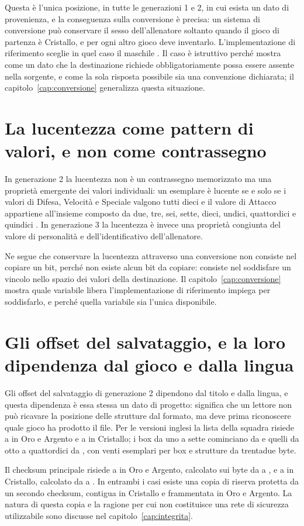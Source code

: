 Questa è l'unica posizione, in tutte le generazioni 1 e 2, in cui esista un dato di provenienza, e la conseguenza sulla conversione è precisa: un sistema di conversione può conservare il sesso dell'allenatore soltanto quando il gioco di partenza è Cristallo, e per ogni altro gioco deve inventarlo. L'implementazione di riferimento sceglie in quel caso il maschile \cite{pccs}. Il caso è istruttivo perché mostra come un dato che la destinazione richiede obbligatoriamente possa essere assente nella sorgente, e come la sola risposta possibile sia una convenzione dichiarata; il capitolo~\ref{cap:conversione} generalizza questa situazione.

\section{La lucentezza come pattern di valori, e non come contrassegno}

In generazione 2 la lucentezza non è un contrassegno memorizzato ma una proprietà emergente dei valori individuali: un esemplare è lucente se e solo se i valori di Difesa, Velocità e Speciale valgono tutti dieci e il valore di Attacco appartiene all'insieme composto da due, tre, sei, sette, dieci, undici, quattordici e quindici \cite{pokecrystal}. In generazione 3 la lucentezza è invece una proprietà congiunta del valore di personalità e dell'identificativo dell'allenatore.

Ne segue che conservare la lucentezza attraverso una conversione non consiste nel copiare un bit, perché non esiste alcun bit da copiare: consiste nel soddisfare un vincolo nello spazio dei valori della destinazione. Il capitolo~\ref{cap:conversione} mostra quale variabile libera l'implementazione di riferimento impiega per soddisfarlo, e perché quella variabile sia l'unica disponibile.

\section{Gli offset del salvataggio, e la loro dipendenza dal gioco e dalla lingua}

Gli offset del salvataggio di generazione 2 dipendono dal titolo e dalla lingua, e questa dipendenza è essa stessa un dato di progetto: significa che un lettore non può ricavare la posizione delle strutture dal formato, ma deve prima riconoscere quale gioco ha prodotto il file. Per le versioni inglesi la lista della squadra risiede a  in Oro e Argento e a  in Cristallo; i box da uno a sette cominciano da  e quelli da otto a quattordici da , con venti esemplari per box e strutture da trentadue byte.

Il checksum principale risiede a  in Oro e Argento, calcolato sui byte da  a , e a  in Cristallo, calcolato da  a . In entrambi i casi esiste una copia di riserva protetta da un secondo checksum, contigua in Cristallo e frammentata in Oro e Argento. La natura di questa copia e la ragione per cui non costituisce una rete di sicurezza utilizzabile sono discusse nel capitolo~\ref{cap:integrita}.
